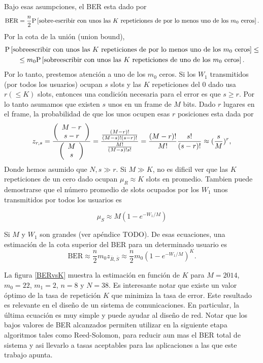 Bajo esas asumpciones, el BER esta dado por
\begin{equation}
\text{BER} = \frac{n}{2}\mathrm{P}\left[\text{sobre-escribir con unos las $K$ repeticiones de por lo menos uno de los $m_0$ ceros}\right].
\label{eq:ber_01}
\end{equation}
Por la cota de la unión (union bound), 
\begin{multline}
\mathrm{P}\left[\text{sobreescribir con unos las $K$ repeticiones de por lo menos uno de los $m_0$ ceros}\right]\leq \\
\leq m_0\mathrm{P}\left[\text{sobreescribir con unos las $K$ repeticiones de uno de los $m_0$ ceros}\right].
\label{eq:union_bound}
\end{multline}
Por lo tanto, prestemos atención a uno de los $m_0$ ceros. Si los $W_{1}$ transmitidos (por todos los usuarios) ocupan $s$ slots y las $K$ repeticiones del 0 dado usa $r ( \leq K)$ slots, entonces una condición necesaria para el error es que $s \geq r$. Por lo tanto asumamos que existen $s$ unos en un frame de $M$ bits. Dado $r$ lugares en el frame, la probabilidad de que los unos ocupen esas $r$ posiciones esta dada por 
\begin{equation}
z_{r,s} = \frac{\left(\begin{array}{c} M-r \\ s-r\end{array}\right)}{\left(\begin{array}{c} M \\ s\end{array}\right)}= \frac{\frac{(M-r)!}{(M-s)! (s-r)!}}{\frac{M!}{(M-s)!s!}} = \frac{(M-r)!}{M!}\frac{s!}{(s-r)!}\approx (\frac{s}{M})^r,
\end{equation}
Donde hemos asumido que $N,s\gg r$. Si $M \gg K$, no es dificil ver que las $K$ repeticiones de un cero dado ocupan $\mu_{R} \approx K$ slots en promedio. Tambien puede demostrarse que el número promedio de slots ocupados por los $W_{1}$ unos transmitidos por todos los usuarios es

\begin{equation}
\mu_{S} \approx M (1-e^{-W_1/M})
\end{equation}
 
Si $M$ y $W_{1}$ son grandes (ver apéndice TODO).
De esas ecuaciones, una estimación de la cota superior del BER para un determinado usuario es
\begin{equation}
\text{BER} \approx \frac{n}{2} m_0 z_{\bar{R},\bar{S}} \approx \frac{n}{2} m_0 \left(1-e^{-W_1/M}\right)^K.
\end{equation}

La figura \ref{BERvsK} muestra la estimación en función de $K$ para $M=2014$, $m_{0} = 22$, $m_{1} = 2$, $n = 8$ y $N=38$. Es interesante notar que existe un valor óptimo de la tasa de repetición $K$ que minimiza la tasa de error. Este resultado es relevante en el diseño de un sistema de comunicaciones. En particular, la última ecuación es muy simple y puede ayudar al diseño de red. Notar que los bajos valores de BER alcanzados permiten utilizar en la siguiente etapa algoritmos tales como Reed-Solomon, para reducir aun mas el BER total de sistema y asi llevarlo a tasas aceptables para las aplicaciones a las que este trabajo apunta.

